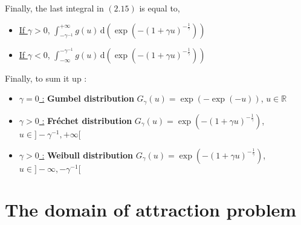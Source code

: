 Finally, the last integral in $(2.15)$ is equal to,
\begin{itemize}
	\item \underline{If $\gamma > 0$},  $\int_{ - \gamma^{-1}}^{+ \infty} \! g(u) \, \mathrm{d}(\exp(- (1 + \gamma u)^{- \frac{1}{\gamma}}))$ 
	\item \underline{If $\gamma < 0$},  $\int_{ - \infty}^{ - \gamma^{-1}} \! g(u) \, \mathrm{d}(\exp(- (1 + \gamma u)^{- \frac{1}{\gamma}}))$ 
\end{itemize}
Finally, to sum it up :
\begin{itemize}
	\item \underline{$\gamma = 0$ :} \textbf{Gumbel distribution} \newline
	$G_\gamma(u) = \exp(- \exp(- u))$, $u \in \mathbb{R}$
	\item \underline{$\gamma > 0$ :} \textbf{Fréchet distribution} \newline
	$G_\gamma(u) = \exp(- (1 + \gamma u)^{- \frac{1}{\gamma}})$, $u \in ]- \gamma^{-1}, + \infty[$
	\item \underline{$\gamma > 0$ :} \textbf{Weibull distribution} \newline
	$G_\gamma(u) = \exp(- (1 + \gamma u)^{- \frac{1}{\gamma}})$, $u \in ]- \infty, - \gamma^{-1}[$
\end{itemize}

\section{The domain of attraction problem}





